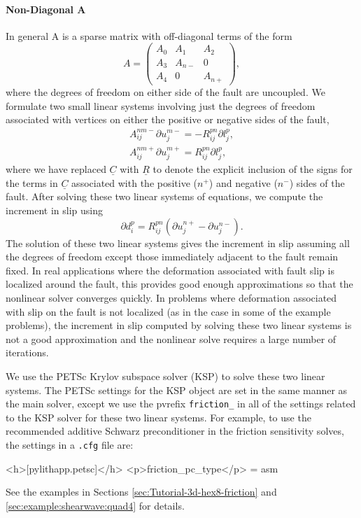 \paragraph{Non-Diagonal A}

In general A is a sparse matrix with off-diagonal terms of the form
\begin{equation}
A=\left(\begin{array}{ccc}
A_{0} & A_{1} & A_{2}\\
A_{3} & A_{n-} & 0\\
A_{4} & 0 & A_{n+}
\end{array}\right),
\end{equation}
where the degrees of freedom on either side of the fault are uncoupled.
We formulate two small linear systems involving just the degrees of
freedom associated with vertices on either the positive or negative
sides of the fault,
\begin{gather}
A_{ij}^{nm-}\partial u_{j}^{m-}=-R_{ij}^{pn}\partial l_{j}^{p},\\
A_{ij}^{nm+}\partial u_{j}^{m+}=R_{ij}^{pn}\partial l_{j}^{p},
\end{gather}
where we have replaced $\underline{C}$ with $\underline{R}$ to denote
the explicit inclusion of the signs for the terms in $\underline{C}$
associated with the positive ($n^{+}$) and negative ($n^{-}$) sides
of the fault. After solving these two linear systems of equations,
we compute the increment in slip using
\begin{equation}
\partial d_{i}^{p}=R_{ij}^{pn}(\partial u_{j}^{n+}-\partial u_{j}^{n-}).
\end{equation}
The solution of these two linear systems gives the increment in slip
assuming all the degrees of freedom except those immediately adjacent
to the fault remain fixed. In real applications where the deformation
associated with fault slip is localized around the fault, this provides
good enough approximations so that the nonlinear solver converges
quickly. In problems where deformation associated with slip on the
fault is not localized (as in the case in some of the example problems),
the increment in slip computed by solving these two linear systems
is not a good approximation and the nonlinear solve requires a large
number of iterations.

We use the PETSc Krylov subspace solver (KSP) to solve these two linear
systems. The PETSc settings for the KSP object are set in the same
manner as the main solver, except we use the pvrefix \texttt{friction\_}
in all of the settings related to the KSP solver for these two linear
systems. For example, to use the recommended additive Schwarz preconditioner
in the friction sensitivity solves, the settings in a \texttt{.cfg}
file are:
\begin{cfg}
<h>[pylithapp.petsc]</h>
<p>friction_pc_type</p> = asm
\end{cfg}
See the examples in Sections \vref{sec:Tutorial-3d-hex8-friction}
and \vref{sec:example:shearwave:quad4} for details.


